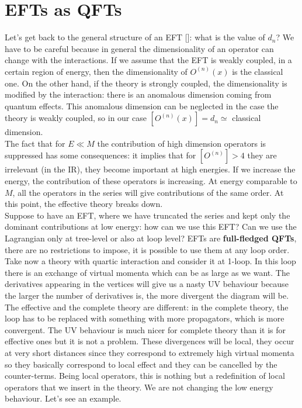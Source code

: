 \documentclass[../main.tex]{subfiles}
\begin{document}
\section{EFTs as QFTs}
Let's get back to the general structure of an EFT []: what is the value of $d_n$? We have to be careful because in general the dimensionality of an operator can change with the interactions. If we assume that the EFT is weakly coupled, in a certain region of energy, then the dimensionality of $O^{(n)}(x)$ is the classical one. On the other hand, if the theory is strongly coupled, the dimensionality is modified by the interaction: there is an anomalous dimension coming from quantum effects. This anomalous dimension can be neglected in the case the theory is weakly coupled, so in our case $[O^{(n)}(x)]=d_n\simeq$ classical dimension.\\
The fact that for $E\ll M$ the contribution of high dimension operators is suppressed has some consequences: it implies that for $[O^{(n)}]>4$ they are irrelevant (in the IR), they become important at high energies. If we increase the energy, the contribution of these operators is increasing. At energy comparable to $M$, all the operators in the series will give contributions of the same order. At this point, the effective theory breaks down.\\
Suppose to have an EFT, where we have truncated the series and kept only the dominant contributions at low energy: how can we use this EFT? Can we use the Lagrangian only at tree-level or also at loop level? EFTs are \textbf{full-fledged QFTs}, there are no restrictions to impose, it is possible to use them at any loop order.\\
Take now a theory with quartic interaction and consider it at 1-loop. In this loop there is an exchange of virtual momenta which can be as large as we want. The derivatives appearing in the vertices will give us a nasty UV behaviour because the larger the number of derivatives is, the more divergent the diagram will be. The effective and the complete theory are different: in the complete theory, the loop has to be replaced with something with more propagators, which is more convergent. The UV behaviour is much nicer for complete theory than it is for effective ones but it is not a problem. These divergences will be local, they occur at very short distances since they correspond to extremely high virtual momenta so they basically correspond to local effect and they can be cancelled by the counter-terms. Being local operators, this is nothing but a redefinition of local operators that we insert in the theory. We are not changing the low energy behaviour. Let's see an example.
\end{document}
